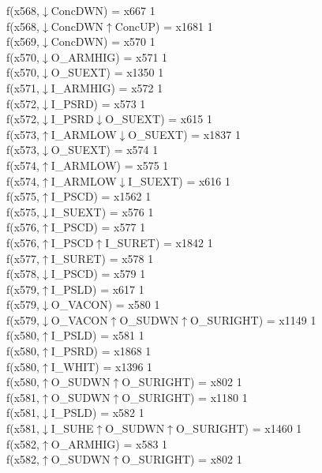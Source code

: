 f(x568,$\downarrow$ConcDWN) = x667 {1} \\
f(x568,$\downarrow$ConcDWN$\uparrow$ConcUP) = x1681 {1} \\
f(x569,$\downarrow$ConcDWN) = x570 {1} \\
f(x570,$\downarrow$O\_ARMHIG) = x571 {1} \\
f(x570,$\downarrow$O\_SUEXT) = x1350 {1} \\
f(x571,$\downarrow$I\_ARMHIG) = x572 {1} \\
f(x572,$\downarrow$I\_PSRD) = x573 {1} \\
f(x572,$\downarrow$I\_PSRD$\downarrow$O\_SUEXT) = x615 {1} \\
f(x573,$\uparrow$I\_ARMLOW$\downarrow$O\_SUEXT) = x1837 {1} \\
f(x573,$\downarrow$O\_SUEXT) = x574 {1} \\
f(x574,$\uparrow$I\_ARMLOW) = x575 {1} \\
f(x574,$\uparrow$I\_ARMLOW$\downarrow$I\_SUEXT) = x616 {1} \\
f(x575,$\uparrow$I\_PSCD) = x1562 {1} \\
f(x575,$\downarrow$I\_SUEXT) = x576 {1} \\
f(x576,$\uparrow$I\_PSCD) = x577 {1} \\
f(x576,$\uparrow$I\_PSCD$\uparrow$I\_SURET) = x1842 {1} \\
f(x577,$\uparrow$I\_SURET) = x578 {1} \\
f(x578,$\downarrow$I\_PSCD) = x579 {1} \\
f(x579,$\uparrow$I\_PSLD) = x617 {1} \\
f(x579,$\downarrow$O\_VACON) = x580 {1} \\
f(x579,$\downarrow$O\_VACON$\uparrow$O\_SUDWN$\uparrow$O\_SURIGHT) = x1149 {1} \\
f(x580,$\uparrow$I\_PSLD) = x581 {1} \\
f(x580,$\uparrow$I\_PSRD) = x1868 {1} \\
f(x580,$\uparrow$I\_WHIT) = x1396 {1} \\
f(x580,$\uparrow$O\_SUDWN$\uparrow$O\_SURIGHT) = x802 {1} \\
f(x581,$\uparrow$O\_SUDWN$\uparrow$O\_SURIGHT) = x1180 {1} \\
f(x581,$\downarrow$I\_PSLD) = x582 {1} \\
f(x581,$\downarrow$I\_SUHE$\uparrow$O\_SUDWN$\uparrow$O\_SURIGHT) = x1460 {1} \\
f(x582,$\uparrow$O\_ARMHIG) = x583 {1} \\
f(x582,$\uparrow$O\_SUDWN$\uparrow$O\_SURIGHT) = x802 {1} \\

